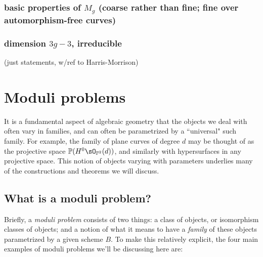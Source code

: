 \subsubsection{basic properties of $M_g$ (coarse rather than fine; fine over automorphism-free curves)}

\subsubsection{dimension $3g-3$, irreducible}  (just statements, w/ref to Harris-Morrison)



\section{Moduli problems}

It is a fundamental aspect of algebraic geometry that the objects we deal with often vary in families, and can often be parametrized by a ``universal" such family. For example, the family of plane curves of degree $d$ may be thought of as the projective
space $\PP(H^{0} \sO_{\PP^{2}}(d))$, and similarly with hypersurfaces in any projective space. This notion of objects varying with parameters underlies many of the constructions and theorems we will discuss. 

\subsection{What is a moduli problem?}

Briefly, a \emph{moduli problem} consists of two things: a class of objects, or isomorphism classes of objects; and a notion of what it means to have a \emph{family} of these objects parametrized by a given scheme $B$. To make this relatively explicit, the four main examples of moduli problems we'll be discussing here are:

